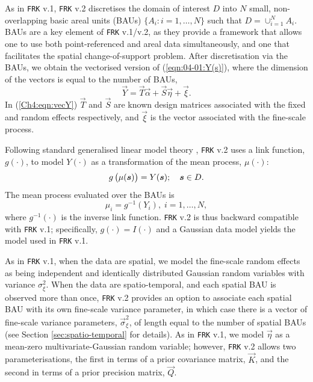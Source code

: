 \documentclass[12pt,a4paper]{article}
\begin{document}
As in \texttt{FRK} v.1, \texttt{FRK} v.2 discretises the domain of interest $D$ into $N$ small, non-overlapping basic areal units (BAUs) $\{A_i:i = 1, \dots, N\}$ such that $D = \cup_{i = 1}^N A_i$. 
BAUs are a key element of \texttt{FRK} v.1/v.2, as they provide a framework that allows one to use both point-referenced and areal data simultaneously, and one that facilitates the spatial change-of-support problem. %
After discretisation via the BAUs, we obtain the vectorised version of (\ref{eqn:04-01:Y(s)}), where the dimension of the vectors is equal to the number of BAUs,
\begin{equation}\label{Ch4:eqn:vecY}
    \vec{Y} = \vec{T}\vec{\alpha} + \vec{S}\vec{\eta} + \vec{\xi}.
\end{equation}
In (\ref{Ch4:eqn:vecY}) $\vec{T}$ and $\vec{S}$ are known design matrices associated with the fixed and random effects respectively, and $\vec{\xi}$ is the vector associated with the fine-scale process. 


Following standard generalised linear model theory \citep{McCullagh_Nelder_1989_GLM}, \texttt{FRK} v.2 uses a link function, $g(\cdot)$, to model $Y(\cdot)$ as a transformation of the mean process, $\mu(\cdot)$:
\[
g\left(\muZgivenY{\vec{s}}\right) = Y(\vec{s}); \quad \vec{s} \in D.
\]
The mean process evaluated over the BAUs is 
\[
\mu_i = g^{-1}(Y_i), \; i = 1, \dots, N,
\]
where $g^{-1}(\cdot)$ is the inverse link function. 
\texttt{FRK} v.2 is thus backward compatible with \texttt{FRK} v.1; specifically, $g(\cdot) = I(\cdot)$ and a Gaussian data model yields the model used in \texttt{FRK} v.1.


As in \texttt{FRK} v.1, when the data are spatial, we model the fine-scale random effects as being independent and identically distributed Gaussian random variables with variance $\sigma^2_\xi$. 
When the data are spatio-temporal, and each spatial BAU is observed more than once, \texttt{FRK} v.2 provides an option to associate each spatial BAU with its own fine-scale variance parameter, in which case there is a vector of fine-scale variance parameters, $\vec{\sigma}^2_\xi$, of length equal to the number of spatial BAUs  (see Section \ref{sec:spatio-temporal} for details). 
As in \texttt{FRK} v.1, we model $\vec{\eta}$ as a mean-zero multivariate-Gaussian random variable; however, \texttt{FRK} v.2 allows two parameterisations, the first in terms of a prior covariance matrix, $\vec{K}$, and the second in terms of a prior precision matrix, $\vec{Q}$. 
\end{document}
